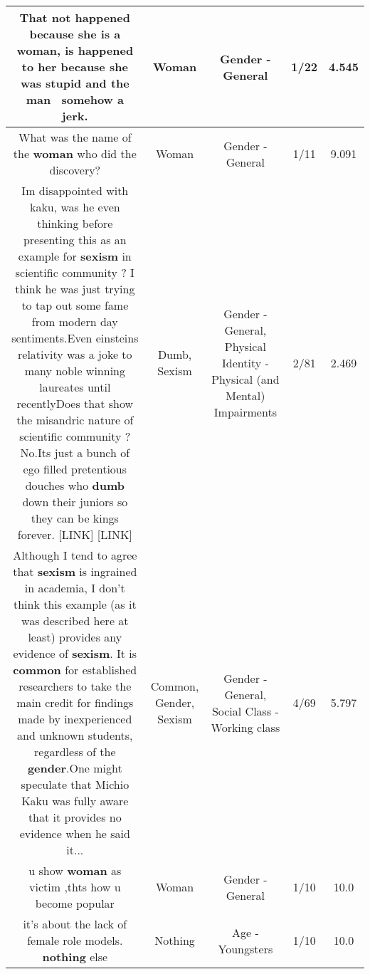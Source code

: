 \documentclass[11pt]{article}
\newlength\mylength
\begin{document}
\begin{center}
\begin{longtable}{|C{.65\mylength}|C{.30\mylength}|C{.12\mylength}|C{.12\mylength}|C{.12\mylength}|}
  \small That not happened because she is a \textbf{woman}, is happened to her because she was stupid and the man  somehow a jerk.\normalsize   & Woman & Gender - General & 1/22 & 4.545 \\  \hline
  \small What was the name of the \textbf{woman} who did the discovery?\normalsize   & Woman & Gender - General & 1/11 & 9.091 \\  \hline
  \small Im disappointed with kaku, was he even thinking before presenting this as an example for \textbf{sexism} in scientific community ? I think he was just trying to tap out some fame from modern day sentiments.Even einsteins relativity was a joke to many noble winning laureates until recentlyDoes that show the misandric nature of scientific community ? No.Its just a bunch of ego filled pretentious douches who \textbf{dumb} down their juniors so they can be kings forever. [LINK]  [LINK] \normalsize   & Dumb, Sexism & Gender - General, Physical Identity - Physical (and Mental) Impairments & 2/81 & 2.469 \\  \hline
  \small Although I tend to agree that \textbf{sexism} is ingrained in academia, I don't think this example (as it was described here at least) provides any evidence of \textbf{sexism}. It is \textbf{common} for established researchers to take the main credit for findings made by inexperienced and unknown students, regardless of the \textbf{gender}.One might speculate that Michio Kaku was fully aware that it provides no evidence when he said it...\normalsize   & Common, Gender, Sexism & Gender - General, Social Class - Working class & 4/69 & 5.797 \\  \hline
  \small u show \textbf{woman} as victim ,thts how u become popular\normalsize   & Woman & Gender - General & 1/10 & 10.0 \\  \hline
  \small it's about the lack of female role models. \textbf{nothing} else\normalsize   & Nothing & Age - Youngsters & 1/10 & 10.0 \\  \hline

\end{longtable}
\end{center}
\end{document}
